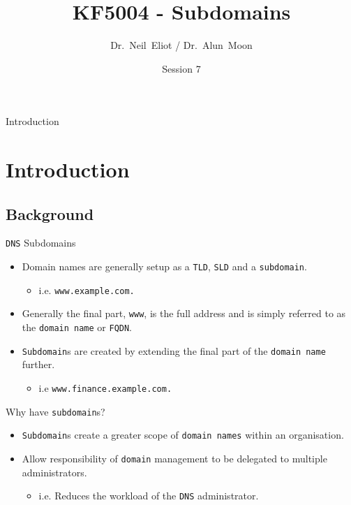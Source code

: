 \documentclass[xcolor=table]{beamer}
\title{KF5004 - Subdomains}
\author{Dr.~Neil~Eliot\inst{1} / Dr.~Alun~Moon\inst{1}}
\institute[Northumbria University] %
{
  \inst{1}
  Department of Computer and Information Sciences\\
  University of Northumbria
}
\date{Session 7}
\begin{document}
\begin{frame}
  \titlepage
\end{frame}

\begin{frame}{Introduction}
  \tableofcontents
\end{frame}


\section{Introduction}
\subsection{Background}
\begin{frame}{\texttt{DNS} Subdomains}
  \begin{itemize}
    \item Domain names are generally setup as a \texttt{TLD}, \texttt{SLD} and a \texttt{subdomain}.
      \begin{itemize}
        \item i.e. \texttt{www.example.com.}
      \end{itemize}
    \item Generally the final part, \texttt{www}, is the full address and is simply referred to as the \texttt{domain name} or \texttt{FQDN}.
    \item \texttt{Subdomain}s are created by extending the final part of the \texttt{domain name} further.
      \begin{itemize}
        \item i.e \texttt{www.finance.example.com.}
      \end{itemize}
  \end{itemize}
\end{frame}

\begin{frame}{Why have \texttt{subdomain}s?}
  \begin{itemize}
    \item \texttt{Subdomain}s create a greater scope of \texttt{domain names} within an organisation.
    \item Allow responsibility of \texttt{domain} management to be delegated to multiple administrators.
    \begin{itemize}
      \item i.e. Reduces the workload of the \texttt{DNS} administrator.
    \end{itemize}
  \end{itemize}
\end{frame}
\end{document}
